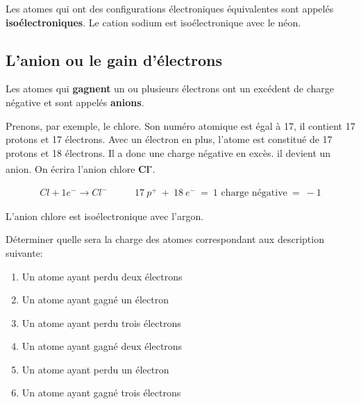 \documentclass[
  11pt,
  a4paper,
  openany]{book}
\providecommand{\tightlist}{%
  \setlength{\itemsep}{0pt}\setlength{\parskip}{0pt}}
\begin{document}
Les atomes qui ont des configurations électroniques équivalentes sont appelés \textbf{isoélectroniques}. Le cation sodium est isoélectronique avec le néon.

\subsection{L'anion ou le gain d'électrons}\label{lanion-ou-le-gain-duxe9lectrons}

Les atomes qui \textbf{gagnent} un ou plusieurs électrons ont un excédent de charge négative et sont appelés \textbf{anions}.

Prenons, par exemple, le chlore. Son numéro atomique est égal à 17, il contient 17 protons et 17 électrons. Avec un électron en plus, l'atome est constitué de 17 protons et 18 électrons. Il a donc une charge négative en excès. il devient un anion. On écrira l'anion chlore \textbf{Cl\textsuperscript{-}}.

\[ \begin{split}
        Cl + 1e^- \rightarrow Cl^-
    \end{split}
    \qquad
    \begin{split}
        17\:p^{+}\:+\:18\:e^{-}\:=\:\text{1 charge négative}\:=\: -1
    \end{split} \]

L'anion chlore est isoélectronique avec l'argon.

\begin{Exercise}

Déterminer quelle sera la charge des atomes correspondant aux description suivante:

\begin{enumerate}
\def\labelenumi{\arabic{enumi}.}
\tightlist
\item
  Un atome ayant perdu deux électrons\\
\item
  Un atome ayant gagné un électron\\
\item
  Un atome ayant perdu trois électrons\\
\item
  Un atome ayant gagné deux électrons\\
\item
  Un atome ayant perdu un électron\\
\item
  Un atome ayant gagné trois électrons
\end{enumerate}

\end{Exercise}
\end{document}
